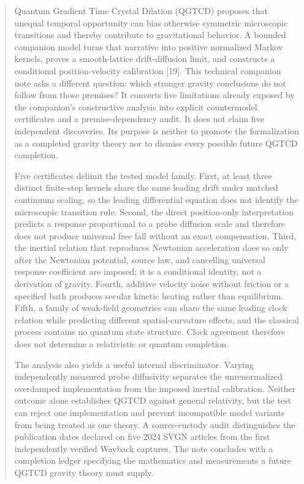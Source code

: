 \documentclass[
  american,
  11pt,
  letterpaper,
]{article}
\begin{document}
\begin{abstract}

Quantum Gradient Time Crystal Dilation (QGTCD) proposes that unequal temporal opportunity can bias otherwise symmetric microscopic transitions and thereby contribute to gravitational behavior. A bounded companion model turns that narrative into positive normalized Markov kernels, proves a smooth-lattice drift-diffusion limit, and constructs a conditional position-velocity calibration {[}19{]}. This technical companion note asks a different question: which stronger gravity conclusions do not follow from those premises? It converts five limitations already exposed by the companion's constructive analysis into explicit countermodel certificates and a premise-dependency audit. It does not claim five independent discoveries. Its purpose is neither to promote the formalization as a completed gravity theory nor to dismiss every possible future QGTCD completion.

Five certificates delimit the tested model family. First, at least three distinct finite-step kernels share the same leading drift under matched continuum scaling, so the leading differential equation does not identify the microscopic transition rule. Second, the direct position-only interpretation predicts a response proportional to a probe diffusion scale and therefore does not produce universal free fall without an exact compensation. Third, the inertial relation that reproduces Newtonian acceleration does so only after the Newtonian potential, source law, and cancelling universal response coefficient are imposed; it is a conditional identity, not a derivation of gravity. Fourth, additive velocity noise without friction or a specified bath produces secular kinetic heating rather than equilibrium. Fifth, a family of weak-field geometries can share the same leading clock relation while predicting different spatial-curvature effects, and the classical process contains no quantum state structure. Clock agreement therefore does not determine a relativistic or quantum completion.

The analysis also yields a useful internal discriminator. Varying independently measured probe diffusivity separates the unrenormalized overdamped implementation from the imposed inertial calibration. Neither outcome alone establishes QGTCD against general relativity, but the test can reject one implementation and prevent incompatible model variants from being treated as one theory. A source-custody audit distinguishes the publication dates declared on five 2024 SVGN articles from the first independently verified Wayback captures. The note concludes with a completion ledger specifying the mathematics and measurements a future QGTCD gravity theory must supply.

\end{abstract}
\end{document}
